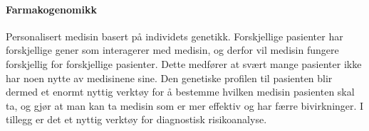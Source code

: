 \paragraph{Farmakogenomikk} Personalisert medisin basert på individets genetikk. Forskjellige pasienter har forskjellige gener som interagerer med medisin, og derfor vil medisin fungere forskjellig for forskjellige pasienter. Dette medfører at svært mange pasienter ikke har noen nytte av medisinene sine. Den genetiske profilen til pasienten blir dermed et enormt nyttig verktøy for å bestemme hvilken medisin pasienten skal ta, og gjør at man kan ta medisin som er mer effektiv og har færre bivirkninger. I tillegg er det et nyttig verktøy for diagnostisk risikoanalyse.

